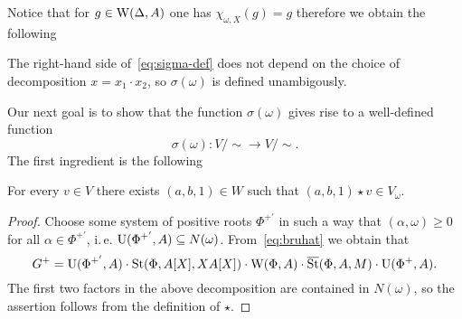 Notice that for $g \in \operatorname{W}(\Delta, A)$ one has $\chi_{\omega, X}(g) = g$ therefore we obtain the following
\begin{cor}
 The right-hand side of~\eqref{eq:sigma-def} does not depend on the choice of decomposition $x = x_1 \cdot x_2$, so $\sigma(\omega)$ is defined unambigously.
\end{cor}


\begin{comment}
We will also need to compute $x^{-1} \cdot \chi_{\omega, X}(x)$ for the representative $x = h_{\alpha_k}(u)\iota(w_\lambda)$. For simplicity, we may assume $w_\lambda = w_\beta(1)$, $\beta \in \Sigma_k$.
\begin{multline} x^{-1} \cdot \chi_{\omega, X}(x) = \{ X, u\} \cdot \iota(w_\lambda)^{-1} \chi_{\omega, X}(w_\lambda) = \\ = \{X, u\} \cdot w_\beta(1)^{-1} w_\beta(X)
\end{multline}
\end{comment}


Our next goal is to show that the function $\sigma(\omega)$ gives rise to a well-defined function
 \[\sigma(\omega)\colon V/\sim \to V/\sim.\]
The first ingredient is the following
\begin{lemma}
 For every $v \in V$ there exists $(a, b, 1) \in W$ such that $(a, b, 1) \star v \in V_\omega$.
\end{lemma}
\begin{proof}
 Choose some system of positive roots $\Phi^{+'}$ in such a way that $(\alpha, \omega) \geq 0$ for all $\alpha \in \Phi^{+'}$, i.\,e. $\operatorname{U}(\Phi^{+'}, A) \subseteq N(\omega)$.
 From~\eqref{eq:bruhat} we obtain that \[G^+ = \operatorname{U}(\Phi^{+'}, A)\cdot \operatorname{St}(\Phi, A[X], XA[X]) \cdot \operatorname{W}(\Phi,A)\cdot \overline{\operatorname{St}}(\Phi, A, M) \cdot\operatorname{U}(\Phi^+, A).\]
 The first two factors in the above decomposition are contained in $N(\omega)$, so the assertion follows from the definition of $\star$.
\end{proof}


